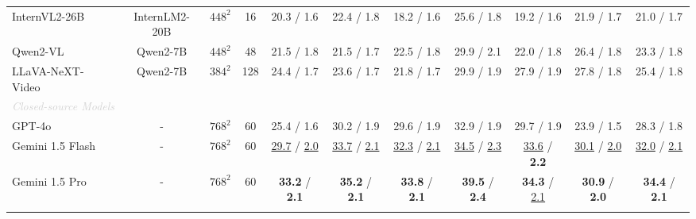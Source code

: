 \begin{table}[t]
{\begin{threeparttable}
\begin{tabular}{l|c|c|c|cccccc|c}
InternVL2-26B~\cite{chen2024far} & InternLM2-20B & $448^{2}$  & 16  &  20.3 / 1.6 & 22.4 / 1.8  & 18.2 / 1.6  & 25.6 / 1.8 & 19.2 / 1.6 & 21.9 / 1.7 & 21.0 / 1.7    \\
Qwen2-VL~\cite{wang2024qwen2} & Qwen2-7B & $448^{2}$ & 48 & {21.5} / {1.8}  & {21.5} / {1.7}  & {22.5} / {1.8} & {29.9} / {2.1}  & {22.0} / {1.8}  & {26.4} / {1.8} & 23.3 / {1.8}    \\
LLaVA-NeXT-Video~\cite{zhang2024llavanextvideo} & Qwen2-7B &  $384^{2}$ & 128 & {24.4} / {1.7} & {23.6} / {1.7} & {21.8} / {1.7} & {29.9} / {1.9}  & {27.9} / {1.9}  & {27.8} / {1.8} & {25.4} / {1.8}  \\
\hline
\multicolumn{11}{l}{\emph{\textcolor{lightgray}{Closed-source Models}}} \\
GPT-4o~\cite{achiam2023gpt} & - & $768^{2}$ & 60 & 25.4 / 1.6 & 30.2 / 1.9  & 29.6 / 1.9  & 32.9 / 1.9  & 29.7 / 1.9 & 23.9 / 1.5 & 28.3 / 1.8   \\
Gemini 1.5 Flash~\cite{reid2024gemini} & - & $768^{2}$ & 60 & \underline{29.7} / \underline{2.0} & \underline{33.7} / \underline{2.1} & \underline{32.3} / \underline{2.1}  & \underline{34.5} / \underline{2.3}  & \underline{33.6} / \textbf{2.2}  & \underline{30.1} / \underline{2.0}  & \underline{32.0} / \underline{2.1}  \\
Gemini 1.5 Pro~\cite{reid2024gemini} & - & $768^{2}$ & 60  & \textbf{33.2} / \textbf{2.1} & \textbf{35.2} / \textbf{2.1}  & \textbf{33.8} / \textbf{2.1}  & \textbf{39.5} / \textbf{2.4}  & \textbf{34.3} / \underline{2.1} & \textbf{30.9} / \textbf{2.0} & \textbf{34.4} / \textbf{2.1}   \\
\Xhline{1pt}
\end{tabular}
\end{threeparttable}}
\vspace{-0.4cm}
\end{table}

